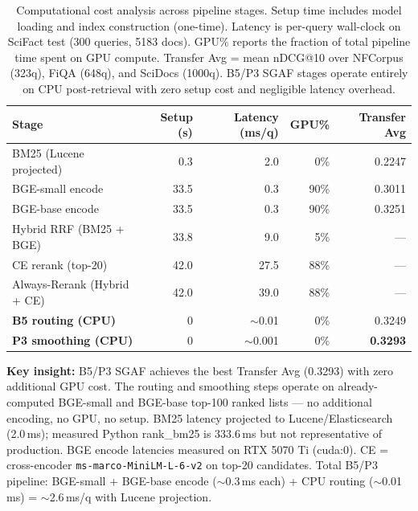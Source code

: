 \begin{table}[htbp]
\centering
\caption{Computational cost analysis across pipeline stages. Setup time includes model loading and index construction (one-time). Latency is per-query wall-clock on SciFact test (300 queries, 5183 docs). GPU\% reports the fraction of total pipeline time spent on GPU compute. Transfer Avg = mean nDCG@10 over NFCorpus (323q), FiQA (648q), and SciDocs (1000q). B5/P3 SGAF stages operate entirely on CPU post-retrieval with zero setup cost and negligible latency overhead.}
\label{tab:cost-analysis}
\small
\begin{tabular}{lrrrr}
\toprule
Stage & Setup (s) & Latency (ms/q) & GPU\% & Transfer Avg \\
\midrule
BM25 (Lucene projected)     & 0.3   & 2.0    & 0\%  & 0.2247 \\
BGE-small encode            & 33.5  & 0.3    & 90\% & 0.3011 \\
BGE-base encode             & 33.5  & 0.3    & 90\% & 0.3251 \\
Hybrid RRF (BM25 + BGE)     & 33.8  & 9.0    & 5\%  & --- \\
CE rerank (top-20)          & 42.0  & 27.5   & 88\% & --- \\
Always-Rerank (Hybrid + CE) & 42.0  & 39.0   & 88\% & --- \\
\midrule
\textbf{B5 routing (CPU)}   & 0     & $\sim$0.01 & 0\% & 0.3249 \\
\textbf{P3 smoothing (CPU)} & 0     & $\sim$0.001 & 0\% & \textbf{0.3293} \\
\bottomrule
\end{tabular}

\vspace{0.5em}
\footnotesize
\textbf{Key insight:} B5/P3 SGAF achieves the best Transfer Avg (0.3293) with zero additional GPU cost. The routing and smoothing steps operate on already-computed BGE-small and BGE-base top-100 ranked lists --- no additional encoding, no GPU, no setup. BM25 latency projected to Lucene/Elasticsearch (2.0\,ms); measured Python rank\_bm25 is 333.6\,ms but not representative of production. BGE encode latencies measured on RTX 5070 Ti (cuda:0). CE = cross-encoder \texttt{ms-marco-MiniLM-L-6-v2} on top-20 candidates. Total B5/P3 pipeline: BGE-small + BGE-base encode ($\sim$0.3\,ms each) + CPU routing ($\sim$0.01\,ms) = $\sim$2.6\,ms/q with Lucene projection.
\end{table}
